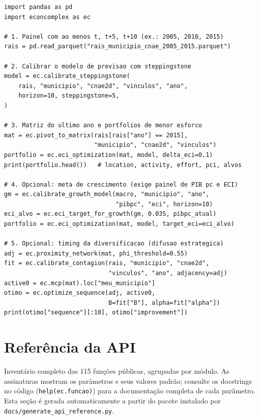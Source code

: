 \documentclass[12pt, a4paper]{article}
\begin{document}
\begin{lstlisting}[caption={Otimiza\c{c}\~{a}o de ECI de ponta a ponta}]
import pandas as pd
import econcomplex as ec

# 1. Painel com ao menos t, t+5, t+10 (ex.: 2005, 2010, 2015)
rais = pd.read_parquet("rais_municipio_cnae_2005_2015.parquet")

# 2. Calibrar o modelo de previsao com steppingstone
model = ec.calibrate_steppingstone(
    rais, "municipio", "cnae2d", "vinculos", "ano",
    horizon=10, steppingstone=5,
)

# 3. Matriz do ultimo ano e portfolios de menor esforco
mat = ec.pivot_to_matrix(rais[rais["ano"] == 2015],
                         "municipio", "cnae2d", "vinculos")
portfolio = ec.eci_optimization(mat, model, delta_eci=0.1)
print(portfolio.head())   # location, activity, effort, pci, alvos

# 4. Opcional: meta de crescimento (exige painel de PIB pc e ECI)
gm = ec.calibrate_growth_model(macro, "municipio", "ano",
                               "pibpc", "eci", horizon=10)
eci_alvo = ec.eci_target_for_growth(gm, 0.035, pibpc_atual)
portfolio = ec.eci_optimization(mat, model, target_eci=eci_alvo)

# 5. Opcional: timing da diversificacao (difusao estrategica)
adj = ec.proximity_network(mat, phi_threshold=0.55)
fit = ec.calibrate_contagion(rais, "municipio", "cnae2d",
                             "vinculos", "ano", adjacency=adj)
active0 = ec.mcp(mat).loc["meu_municipio"]
otimo = ec.optimize_sequence(adj, active0,
                             B=fit["B"], alpha=fit["alpha"])
print(otimo["sequence"][:10], otimo["improvement"])
\end{lstlisting}

\section{Refer\^{e}ncia da API}

Invent\'{a}rio completo das 115 fun\c{c}\~{o}es p\'{u}blicas, agrupadas
por m\'{o}dulo. As assinaturas mostram os par\^{a}metros e seus valores
padr\~{a}o; consulte os docstrings no c\'{o}digo
(\texttt{help(ec.funcao)}) para a documenta\c{c}\~{a}o completa de cada
par\^{a}metro. Esta se\c{c}\~{a}o \'{e} gerada automaticamente a partir
do pacote instalado por \texttt{docs/generate\_api\_reference.py}.


\end{document}
